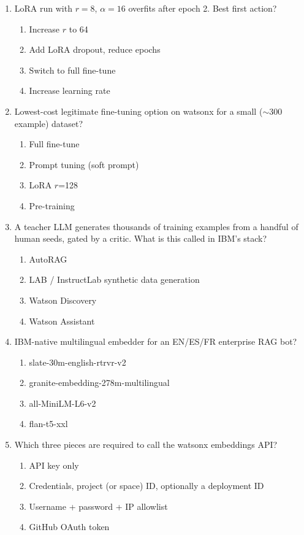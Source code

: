 \begin{enumerate}[leftmargin=*]
\item LoRA run with $r=8$, $\alpha=16$ overfits after epoch 2. Best first action?
\begin{enumerate}[label=\Alph*.]
  \item Increase $r$ to 64 \item Add LoRA dropout, reduce epochs
  \item Switch to full fine-tune \item Increase learning rate
\end{enumerate}

\item Lowest-cost legitimate fine-tuning option on watsonx for a small ($\sim$300 example) dataset?
\begin{enumerate}[label=\Alph*.]
  \item Full fine-tune \item Prompt tuning (soft prompt)
  \item LoRA $r$=128 \item Pre-training
\end{enumerate}

\item A teacher LLM generates thousands of training examples from a handful of human seeds, gated by a critic. What is this called in IBM's stack?
\begin{enumerate}[label=\Alph*.]
  \item AutoRAG \item LAB / InstructLab synthetic data generation
  \item Watson Discovery \item Watson Assistant
\end{enumerate}

\item IBM-native multilingual embedder for an EN/ES/FR enterprise RAG bot?
\begin{enumerate}[label=\Alph*.]
  \item slate-30m-english-rtrvr-v2 \item granite-embedding-278m-multilingual
  \item all-MiniLM-L6-v2 \item flan-t5-xxl
\end{enumerate}

\item Which three pieces are required to call the watsonx embeddings API?
\begin{enumerate}[label=\Alph*.]
  \item API key only \item Credentials, project (or space) ID, optionally a deployment ID
  \item Username + password + IP allowlist \item GitHub OAuth token
\end{enumerate}


\end{enumerate}
